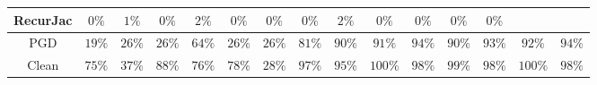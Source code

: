 \begin{table*}
{\begin{tabular}{c|c|c|c|c|c|c|c|c|c|c|c|c|c|c}
     RecurJac &         $0\%$ &         $1\%$ &         $0\%$ &         $2\%$ &         $0\%$ &         $0\%$ &         $0\%$ &         $2\%$ &         $0\%$ &         $0\%$ &         $0\%$ &         $0\%$ &               &               \\
\hline
          PGD &        $19\%$ &        $26\%$ &        $26\%$ &        $64\%$ &        $26\%$ &        $26\%$ &        $81\%$ &        $90\%$ &        $91\%$ &        $94\%$ &        $90\%$ &        $93\%$ &        $92\%$ &        $94\%$ \\
\hline
        Clean &        $75\%$ &        $37\%$ &        $88\%$ &        $76\%$ &        $78\%$ &        $28\%$ &        $97\%$ &        $95\%$ &       $100\%$ &        $98\%$ &        $99\%$ &        $98\%$ &       $100\%$ &        $98\%$ \\

    \bottomrule
    \end{tabular}
    }
    \label{table:exp-A-robust-accuracy-mnist-3}
\end{table*}
    

